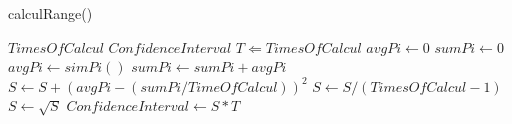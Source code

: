 \documentclass[11pt]{ctexart}
\begin{document}
\renewcommand{\thealgorithm}{3} %
    \begin{algorithm}
        \caption{calculRange()} %
        \begin{algorithmic}[1] %
            \Require $TimesOfCalcul$
            \Ensure $ConfidenceInterval$
            \State $T \Leftarrow TimesOfCalcul$
            \State $avgPi \leftarrow 0$
            \State $sumPi \leftarrow 0$
                \State $avgPi \leftarrow simPi()$
                \State $sumPi \leftarrow sumPi + avgPi$
            \EndFor
                \State $S \leftarrow S+(avgPi-(sumPi/TimeOfCalcul))^2$
            \EndFor
            \State $S \leftarrow S/(TimesOfCalcul-1)$
            \State $S \leftarrow \sqrt S$
            \State $ConfidenceInterval \leftarrow S \ast T$
        \end{algorithmic}
    \end{algorithm}
\end{document}
